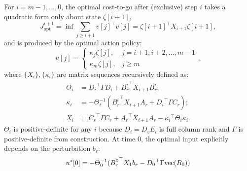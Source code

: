 For \(i= m-1,\hdots,0\), the optimal cost-to-go after (exclusive) step \(i\) takes a quadratic form only about state \(\zeta[i+1]\),
\[
J_\mathrm{opt}^{i + 1} = \inf\sum_{j \geq i + 1} v[j]^\top v[j] = \zeta[i + 1]^\top X_{i+1} \zeta[i + 1],
\]
and is produced by the optimal action policy:
\[
u[j] = \left\{ 
\begin{array}{cc}
    \kappa_j \zeta[j], & j = i+1,i+2,\hdots,m-1 \\
    \kappa_m \zeta[j], & j\geq m
\end{array}\right.,
\]
where \(\{X_i\},\{\kappa_i\}\) are matrix sequences recursively defined as:
\begin{subequations}\label{eqn::backrec}
\begin{align}
    \Theta_i &= {D_{i}}^\top\Gamma D_i + {B_r^i}^\top X_{i+1}{B_r^i}; \\
    \kappa_i &= -\Theta_i^{-1} ({B_r^i}^\top X_{i+1} A_r +{D_{i}}^\top\Gamma C_r); \\
    X_i &= {C_r}^\top \Gamma {C_r} + {A_r}^\top X_{i+1} A_r - {\kappa_i}^\top \Theta_i \kappa_i.
\end{align}
\end{subequations}
\(\Theta_i\) is positive-definite for any \(i\) because \(D_i=D_v E_i\) is full column rank and \(\Gamma\) is positive-definite from construction.
At time \(0\), the optimal input explicitly depends on the perturbation \(b_r\):
\begin{equation}\label{eqn::optu0}
u^*[0] = -\Theta_0^{-1} ({B_r^0}^\top X_{1} b_r -{D_{0}}^\top\Gamma {\mathrm{vec}}(R_0))
\end{equation}
















